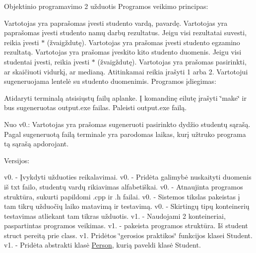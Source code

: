 Objektinio programavimo 2 užduotis Programos veikimo principas\+:

Vartotojas yra paprašomas įvesti studento vardą, pavardę. Vartotojas yra paprašomas įvesti studento namų darbų rezultatus. Jeigu visi rezultatai suvesti, reikia įvesti $\ast$ (žvaigždutę). Vartotojas yra prašomas įvesti studento egzamino rezultatą. Vartotojas yra prašomas įveskito kito studento duomenis. Jeigu visi studentai įvesti, reikia įvesti $\ast$ (žvaigždutę). Vartotojas yra prašomas pasirinkti, ar skaičiuoti vidurkį, ar medianą. Atitinkamai reikia įrašyti 1 arba 2. Vartotojui sugeneruojama lentelė su studento duomenimis. Programos įdiegimas\+:

Atidaryti terminalą atsisiųstų failų aplanke. Į komandinę eilutę įrašyti \char`\"{}make\char`\"{} ir bus sugeneruotas output.\+exe failas. Paleisti output.\+exe failą.

Nuo v0.\+: Vartotojas yra prašomas sugeneruoti pasirinkto dydžio studentų sąrašą. Pagal sugeneruotą failą terminale yra parodomas laikas, kurį užtruko programa tą sąrašą apdorojant.

Versijos\+:

v0. -\/ Įvykdyti užduoties reikalavimai. v0. -\/ Pridėta galimybė nuskaityti duomenis iš txt failo, studentų vardų rikiavimas alfabetiškai. v0. -\/ Atnaujinta programos struktūra, sukurti papildomi .cpp ir .h failai. v0. -\/ Sistemos tikslas pakeistas į tam tikrų užduočių laiko matavimą ir testavimą. v0. -\/ Skirtingų tipų konteinerių testavimas atliekant tam tikras užduotis. v1. -\/ Naudojami 2 konteineriai, paspartintas programos veikimas. v1. -\/ pakeista programos struktūra. Iš student struct pereitą prie class. v1. Pridėtos \char`\"{}gerosios praktikos\char`\"{} funkcijos klasei Student. v1. -\/ Pridėta abstrakti klasė \mbox{\hyperlink{class_person}{Person}}, kurią paveldi klasė Student. 